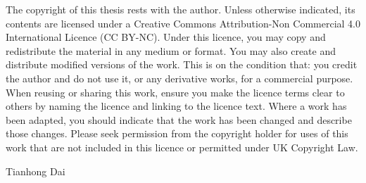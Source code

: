 \cleardoublepage

\begin{mycopyright}
The copyright of this thesis rests with the author. Unless otherwise indicated,
its contents are licensed under a Creative Commons Attribution-Non
Commercial 4.0 International Licence (CC BY-NC).
Under this licence, you may copy and redistribute the material in any medium
or format. You may also create and distribute modified versions of the work.
This is on the condition that: you credit the author and do not use it, or any
derivative works, for a commercial purpose.
When reusing or sharing this work, ensure you make the licence terms clear to
others by naming the licence and linking to the licence text. Where a work has
been adapted, you should indicate that the work has been changed and
describe those changes.
Please seek permission from the copyright holder for uses of this work that are
not included in this licence or permitted under UK Copyright Law.

\hfill Tianhong Dai
\end{mycopyright}